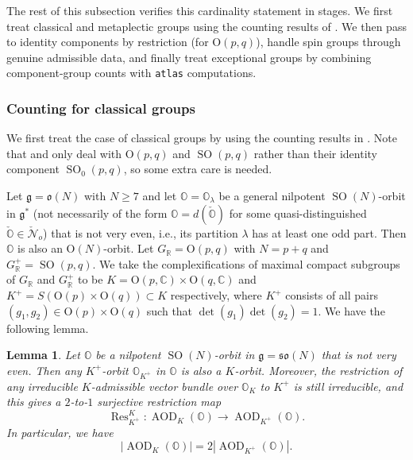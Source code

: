 \documentclass[11pt, a4paper]{amsart}
\newcommand{\C}{\mathbb{C}}
\newcommand{\g}{\mathfrak{g}}
\newcommand{\orb}{\mathbb{O}}
\newcommand{\orbk}{\orb_{K}}
\newcommand{\fo}{\mathfrak{o}}
\newcommand{\ckorb}{\check{\orb}}
\newcommand{\fso}{\mathfrak{so}}
\newcommand{\cN}{\mathcal{N}}
\DeclareMathOperator{\AOD}{AOD}
\DeclareMathOperator{\res}{Res}
\newcommand{\AODK}{\AOD_K}
\newcommand{\SO}{\operatorname{SO}}
\newcommand{\R}{\mathbb{R}}
\newcommand{\GR}{G_\R}
\newtheorem{Lem}[Thm]{Lemma}
\theoremstyle{definition}
\numberwithin{equation}{section}
\begin{document}
The rest of this subsection verifies this cardinality statement in stages. We first treat classical and metaplectic groups using the counting results of \cite{BMSZ:counting, BMSZ:construction_unitarity}. We then pass to identity components by restriction (for $\mathrm{O}(p,q)$), handle spin groups through genuine admissible data, and finally treat exceptional groups by combining component-group counts with \texttt{atlas} computations.

\subsubsection{Counting for classical groups} \label{subsubsec:counting_classical}

We first treat the case of classical groups by using the counting results in \cite{BMSZ:counting}. Note that \cite{BMSZ:counting} and \cite{BMSZ:construction_unitarity} only deal with $\mathrm{O}(p,q)$ and $\SO(p,q)$ rather than their identity component $\SO_0(p,q)$, so some extra care is needed. 

Let $\g = \fo(N)$ with $N \geqslant 7$ and let $\orb = \orb_\lambda$ be a general nilpotent $\SO(N)$-orbit in $\g^*$ (not necessarily of the form $\orb = d(\ckorb)$ for some quasi-distinguished $\ckorb \in \check{\cN}_o$) that is not very even, i.e., its partition $\lambda$ has at least one odd part. Then $\orb$ is also an 	$\mathrm{O}(N)$-orbit. 
Let $\GR = \mathrm{O}(p,q)$ with $N = p + q$ and $\GR^+=\SO(p,q)$. We take the complexifications of maximal compact subgroups of $\GR$ and $\GR^+$ to be $K = \mathrm{O}(p,\C) \times \mathrm{O}(q,\C)$ and $K^+ = S(\mathrm{O}(p) \times \mathrm{O}(q)) \subset K$ respectively, where $K^+$ consists of all pairs $(g_1, g_2) \in \mathrm{O}(p) \times \mathrm{O}(q)$ such that $\det(g_1)\det(g_2) = 1$. We have the following lemma.

\begin{Lem} \label{lem:res_Opq}
	Let $\orb$ be a nilpotent $\SO(N)$-orbit in $\g = \fso(N)$ that is not very even. Then any $K^+$-orbit $\orb_{K^+}$ in $\orb$ is also a $K$-orbit. Moreover, the restriction of any irreducible $K$-admissible vector bundle over $\orbk$ to $K^+$ is still irreducible, and this gives a $2$-to-$1$ surjective restriction map 
	\[\res_{K^+}^{K}: \AODK(\orb) \to \AOD_{K^+}(\orb).\] 
	In particular, we have 
	\[|\AODK(\orb)| = 2|\AOD_{K^+}(\orb)|.\] 
\end{Lem}
\end{document}
